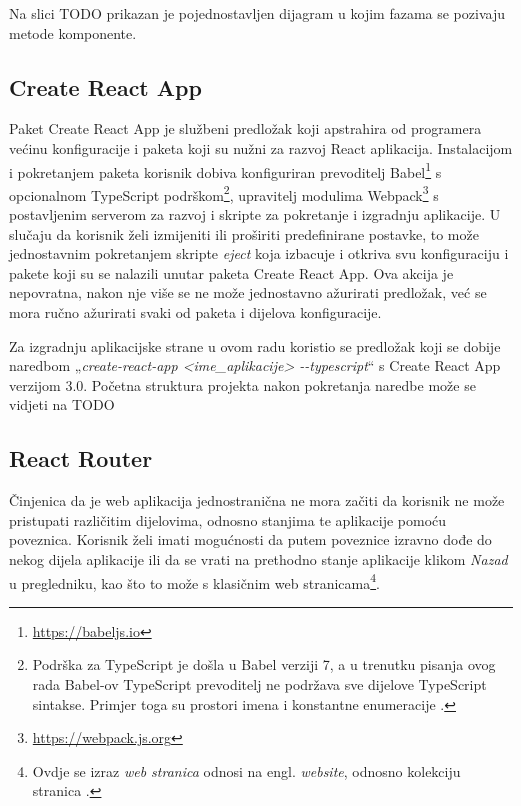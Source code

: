 \documentclass[times, utf8, diplomski, numeric]{fer}
\newcommand{\razmakp}{\vspace{18pt}}
\newcommand{\razmaks}{\vspace{10pt}}
\begin{document}
Na slici TODO prikazan je pojednostavljen dijagram u kojim fazama se pozivaju metode komponente.


\razmaks
\subsection{Create React App} \label{sec:cra}

Paket Create React App je službeni predložak koji apstrahira od programera većinu konfiguracije i paketa koji su nužni za razvoj React aplikacija.
Instalacijom i pokretanjem paketa korisnik dobiva konfiguriran prevoditelj Babel\footnote{\url{https://babeljs.io}} s opcionalnom TypeScript podrškom\footnote{
    Podrška za TypeScript je došla u Babel verziji 7, a u trenutku pisanja ovog rada Babel-ov TypeScript prevoditelj ne podržava sve dijelove TypeScript sintakse. Primjer toga su prostori imena  i konstantne enumeracije \citep{ms_dev_babel}.
}, upravitelj modulima Webpack\footnote{\url{https://webpack.js.org}} s postavljenim serverom za razvoj i skripte za pokretanje i izgradnju aplikacije.
U slučaju da korisnik želi izmijeniti ili proširiti predefinirane postavke, to može jednostavnim pokretanjem skripte \emph{eject} koja izbacuje i otkriva svu konfiguraciju i pakete koji su se nalazili unutar paketa Create React App.
Ova akcija je nepovratna, nakon nje više se ne može jednostavno ažurirati predložak, već se mora ručno ažurirati svaki od paketa i dijelova konfiguracije\citep{gh_cra}.

\razmakp

Za izgradnju aplikacijske strane u ovom radu koristio se predložak koji se dobije naredbom „\emph{create-react-app <ime\_aplikacije> -{}-typescript}“ s Create React App verzijom 3.0.
Početna struktura projekta nakon pokretanja naredbe može se vidjeti na TODO


\razmaks
\subsection{React Router}

Činjenica da je web aplikacija jednostranična ne mora začiti da korisnik ne može pristupati različitim dijelovima, odnosno stanjima te aplikacije pomoću poveznica.
Korisnik želi imati mogućnosti da putem poveznice izravno dođe do nekog dijela aplikacije ili da se vrati na prethodno stanje aplikacije klikom \emph{Nazad} u pregledniku, kao što to može s klasičnim web stranicama\footnote{Ovdje se izraz \emph{web stranica} odnosi na engl. \emph{website}, odnosno kolekciju stranica .}.
\end{document}
